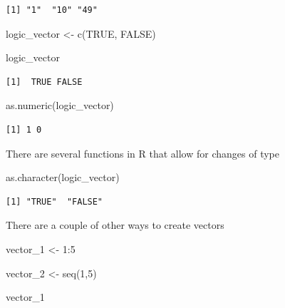 \documentclass[
  letterpaper,
  DIV=11,
  numbers=noendperiod]{scrartcl}
\newenvironment{Shaded}{\begin{snugshade}}{\end{snugshade}}
\newcommand{\ConstantTok}[1]{\textcolor[rgb]{0.56,0.35,0.01}{#1}}
\newcommand{\DecValTok}[1]{\textcolor[rgb]{0.68,0.00,0.00}{#1}}
\newcommand{\FunctionTok}[1]{\textcolor[rgb]{0.28,0.35,0.67}{#1}}
\newcommand{\NormalTok}[1]{\textcolor[rgb]{0.00,0.23,0.31}{#1}}
\newcommand{\OtherTok}[1]{\textcolor[rgb]{0.00,0.23,0.31}{#1}}
\newcommand{\SpecialCharTok}[1]{\textcolor[rgb]{0.37,0.37,0.37}{#1}}
\begin{document}
\begin{verbatim}
[1] "1"  "10" "49"
\end{verbatim}

\begin{Shaded}
\begin{Highlighting}[]
\NormalTok{logic\_vector }\OtherTok{\textless{}{-}} \FunctionTok{c}\NormalTok{(}\ConstantTok{TRUE}\NormalTok{, }\ConstantTok{FALSE}\NormalTok{)}

\NormalTok{logic\_vector}
\end{Highlighting}
\end{Shaded}

\begin{verbatim}
[1]  TRUE FALSE
\end{verbatim}

\begin{Shaded}
\begin{Highlighting}[]
\FunctionTok{as.numeric}\NormalTok{(logic\_vector)}
\end{Highlighting}
\end{Shaded}

\begin{verbatim}
[1] 1 0
\end{verbatim}

There are several functions in R that allow for changes of type

\begin{Shaded}
\begin{Highlighting}[]
\FunctionTok{as.character}\NormalTok{(logic\_vector)}
\end{Highlighting}
\end{Shaded}

\begin{verbatim}
[1] "TRUE"  "FALSE"
\end{verbatim}

There are a couple of other ways to create vectors

\begin{Shaded}
\begin{Highlighting}[]
\NormalTok{vector\_1 }\OtherTok{\textless{}{-}} \DecValTok{1}\SpecialCharTok{:}\DecValTok{5}

\NormalTok{vector\_2 }\OtherTok{\textless{}{-}} \FunctionTok{seq}\NormalTok{(}\DecValTok{1}\NormalTok{,}\DecValTok{5}\NormalTok{)}

\NormalTok{vector\_1}
\end{Highlighting}
\end{Shaded}
\end{document}
